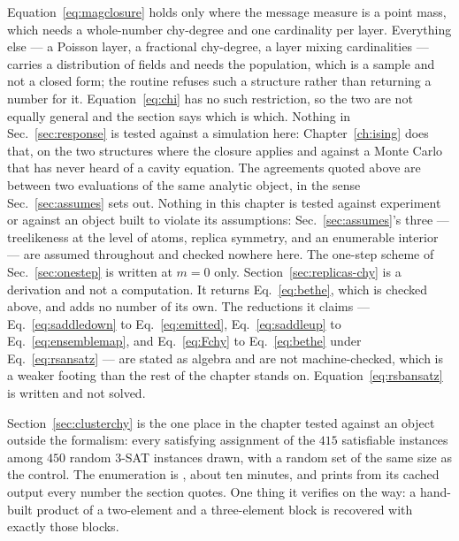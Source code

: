 Equation~\eqref{eq:magclosure} holds only where the message measure is a point
mass, which needs a whole-number chy-degree and one cardinality per layer.
Everything else --- a Poisson layer, a fractional chy-degree, a layer mixing
cardinalities --- carries a distribution of fields and needs the population,
which is a sample and not a closed form; the routine refuses such a structure
rather than returning a number for it. Equation~\eqref{eq:chi} has no such
restriction, so the two are not equally general and the section says which is
which. Nothing in Sec.~\ref{sec:response} is tested against a simulation
here: Chapter~\ref{ch:ising} does that, on the two structures where the
closure applies and against a Monte Carlo that has never heard of a cavity
equation.
The agreements quoted above are between two evaluations of the same analytic
object, in the sense Sec.~\ref{sec:assumes} sets out. Nothing in this chapter is
tested against experiment or against an object built to violate its assumptions:
Sec.~\ref{sec:assumes}'s three --- treelikeness at the level of atoms, replica
symmetry, and an enumerable interior --- are assumed throughout and checked
nowhere here. The one-step scheme of Sec.~\ref{sec:onestep} is written at $m=0$
only.
Section~\ref{sec:replicas-chy} is a derivation and not a computation. It
returns Eq.~\eqref{eq:bethe}, which is checked above, and adds no number of its
own. The reductions it claims --- Eq.~\eqref{eq:saddledown} to
Eq.~\eqref{eq:emitted}, Eq.~\eqref{eq:saddleup} to
Eq.~\eqref{eq:ensemblemap}, and Eq.~\eqref{eq:Fchy} to Eq.~\eqref{eq:bethe}
under Eq.~\eqref{eq:rsansatz} --- are stated as algebra and are not
machine-checked, which is a weaker footing than the rest of the chapter stands
on. Equation~\eqref{eq:rsbansatz} is written and not solved.

Section~\ref{sec:clusterchy} is the one place in the chapter tested against
an object outside the formalism: every satisfying assignment of the $415$
satisfiable instances among $450$ random $3$-SAT instances drawn, with a
random set of the same size as the control. The
enumeration is , about ten minutes, and
 prints from its cached output
every number the section quotes. One thing it verifies on the way: a
hand-built product of a two-element and a three-element block is recovered
with exactly those blocks.
